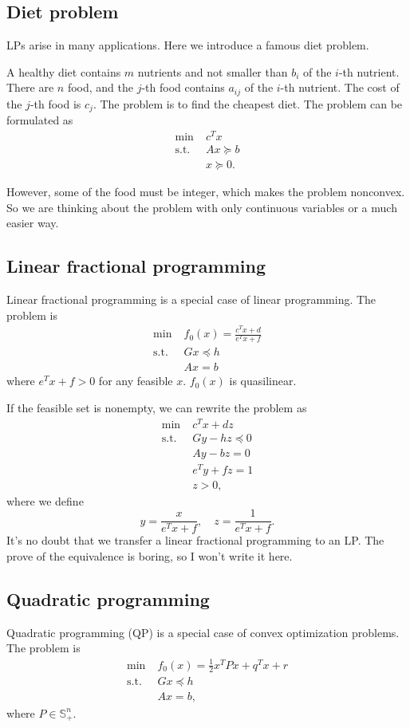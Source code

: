 \documentclass[lang=en,color=blue,mode=fancy,titlestyle=hang]{elegantbook}
\begin{document}
\subsection{Diet problem}

LPs arise in many applications. Here we introduce a famous diet problem.

A healthy diet contains $m$ nutrients and not smaller than $b_i$ of the $i$-th nutrient.
There are $n$ food, and the $j$-th food contains $a_{ij}$ of the $i$-th nutrient.
The cost of the $j$-th food is $c_j$. The problem is to find the cheapest diet.
The problem can be formulated as
\begin{align*}
\min \; &c^T x\\
\text{s.t.} \; &Ax \succeq b\\
&x \succeq 0.
\end{align*}

However, some of the food must be integer, which makes the problem nonconvex. So we are
thinking about the problem with only continuous variables or a much easier way.

\subsection{Linear fractional programming}

Linear fractional programming is a special case of linear programming. The problem is
\begin{align*}
\min \; &f_0(x) = \frac{c^T x + d}{e^T x + f}\\
\text{s.t.} \; &Gx \preceq h\\
&Ax = b
\end{align*}
where $e^T x + f > 0$ for any feasible $x$. $f_0(x)$ is quasilinear.

If the feasible set is nonempty, we can rewrite the problem as
\begin{align*}
\min \; &c^T x + dz\\
\text{s.t.} \; &Gy - hz \preceq 0\\
&Ay - bz = 0\\
&e^T y + fz = 1\\
&z > 0,
\end{align*}
where we define
\[
y = \frac{x}{e^T x + f}, \quad z = \frac{1}{e^T x + f}.
\]
It's no doubt that we transfer a linear fractional programming to an LP. The prove of
the equivalence is boring, so I won't write it here.

\subsection{Quadratic programming}
Quadratic programming (QP) is a special case of convex optimization problems. The problem is
\begin{align*}
\min \; &f_0(x) = \frac12 x^T P x + q^T x + r\\
\text{s.t.} \; &Gx \preceq h\\
&Ax = b,
\end{align*}
where $P \in \mathbb{S}^n_+$.
\end{document}
